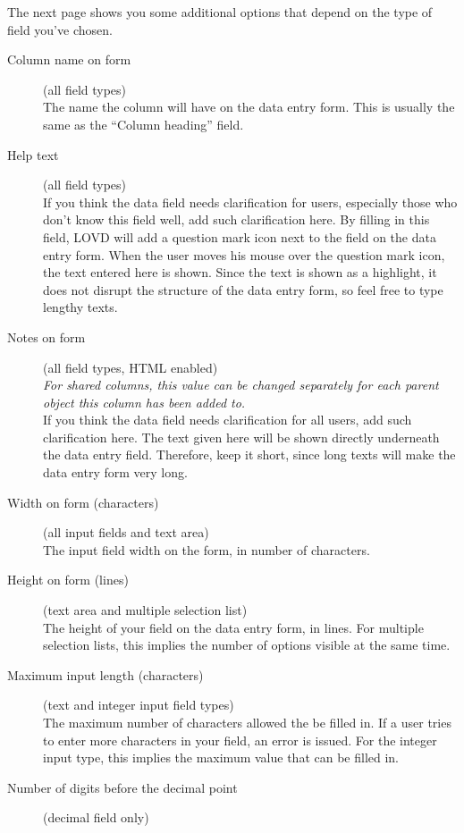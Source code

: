 \documentclass[a4paper,oneside,openany,12pt]{memoir}
\begin{document}
\vskip 1cm

\noindent
The next page shows you some additional options that depend on the type of field you've chosen.
\begin{description}
  \item[Column name on form] (all field types)\hfill \\
  The name the column will have on the data entry form.
  This is usually the same as the ``Column heading'' field.
  \item[Help text] (all field types)\hfill \\
  If you think the data field needs clarification for users, especially those who don't know this field well, add such clarification here.
  By filling in this field, LOVD will add a question mark icon next to the field on the data entry form.
  When the user moves his mouse over the question mark icon, the text entered here is shown.
  Since the text is shown as a highlight, it does not disrupt the structure of the data entry form, so feel free to type lengthy texts.
  \item[Notes on form] (all field types, HTML enabled)\hfill \\
  \emph{For shared columns, this value can be changed separately for each parent object this column has been added to.}
  \\
  If you think the data field needs clarification for all users, add such clarification here.
  The text given here will be shown directly underneath the data entry field.
  Therefore, keep it short, since long texts will make the data entry form very long.
  \item[Width on form (characters)] (all input fields and text area)\hfill \\
  The input field width on the form, in number of characters.
  \item[Height on form (lines)] (text area and multiple selection list)\hfill \\
  The height of your field on the data entry form, in lines.
  For multiple selection lists, this implies the number of options visible at the same time.
  \item[Maximum input length (characters)] (text and integer input field types)\hfill \\
  The maximum number of characters allowed the be filled in.
  If a user tries to enter more characters in your field, an error is issued.
  For the integer input type, this implies the maximum value that can be filled in.
  \item[Number of digits before the decimal point] (decimal field only)\hfill \\

\end{description}
\end{document}
